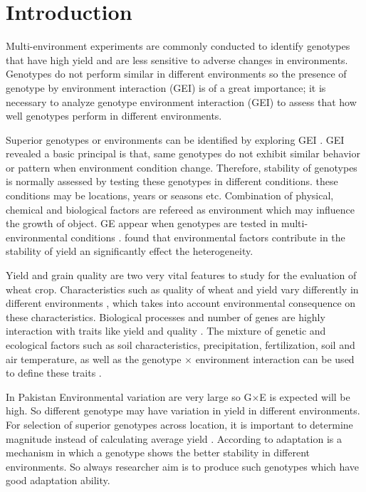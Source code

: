 \chapter{Introduction}\label{intro_chapter}

Multi-environment experiments are commonly conducted to identify genotypes that have high yield and are less sensitive to adverse changes in environments. Genotypes do not perform similar in different environments so the presence of genotype by environment interaction (GEI) is of a great importance; it is necessary to analyze genotype environment interaction (GEI) to assess that how well genotypes perform in different environments.

Superior genotypes or environments can be identified by exploring GEI \citep{Allard1964}. GEI revealed a basic principal is that, same genotypes do not exhibit similar behavior or pattern when environment condition change. Therefore, stability of genotypes is normally assessed by testing these genotypes in different conditions. these conditions may be locations, years or seasons etc. Combination of physical, chemical and biological factors are refereed as environment which may influence the growth of object. GE appear when genotypes are tested in multi-environmental conditions \citep{Becker1988}. \citet{ Magari1993}  found that environmental factors contribute in the stability of  yield an significantly effect the heterogeneity.

Yield and grain quality are two very vital features to study for the evaluation of wheat crop. 
Characteristics such as quality of wheat and yield vary differently in different environments \citep{Uhlen1998}, which takes into account environmental consequence on these characteristics. Biological processes and number of genes are highly interaction with traits like yield and quality . The mixture of genetic and ecological factors such as soil characteristics, precipitation, fertilization, soil and air temperature, as well as the genotype $\times$ environment  interaction  can be used to define these traits \citep{Peterson1992,Johansson2003}.
 
 In Pakistan Environmental variation are very large so G$\times$E is expected will be high. So different genotype may have variation in yield in different environments. For selection of superior genotypes across location, it is important to determine magnitude instead of calculating average yield \citep{Gauch1997}. According to \citet{Simmonds1962} adaptation is a mechanism  in which a genotype shows the better stability in different environments. So  always researcher aim is to produce such genotypes which have good adaptation ability. 

